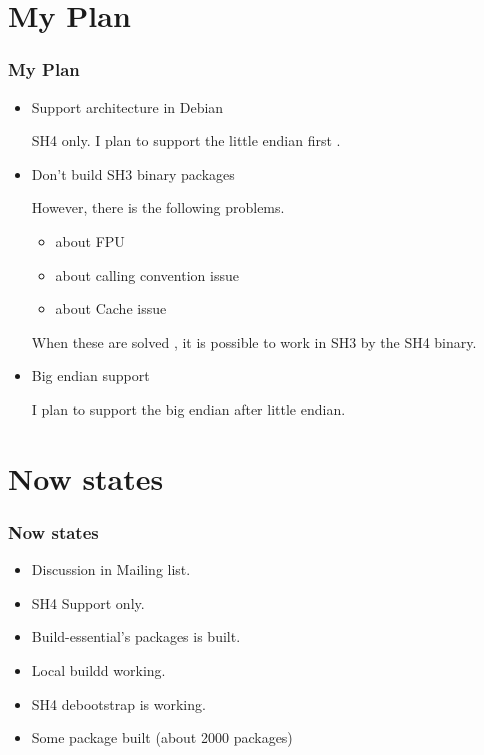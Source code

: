\documentclass[cjk,dvipdfm,12pt]{beamer}
\begin{document}
\section{My Plan}
\begin{frame}
 \frametitle{My Plan}
 \begin{itemize}
  \item Support architecture in Debian
    
	SH4 only. 
	I plan to support the little endian first .

  \item Don't build SH3 binary packages

	However, there is the following problems. 
	\begin{itemize}
	  \item about FPU
	  \item about calling convention issue
	  \item about Cache issue
	\end{itemize}

	When these are solved , it is possible to 
	work in SH3 by the SH4 binary. 
	
	

  \item Big endian support

	I plan to support the big endian after little endian.
  
 \end{itemize}
\end{frame}

\section{Now states}

\begin{frame}
 \frametitle{Now states}
 \begin{itemize}
  \item Discussion in Mailing list.
  \item SH4 Support only.
  \item Build-essential's packages is built.
  \item Local buildd working.
  \item SH4 debootstrap is working.
  \item Some package built (about 2000 packages)
 \end{itemize}
\end{frame}
\end{document}
